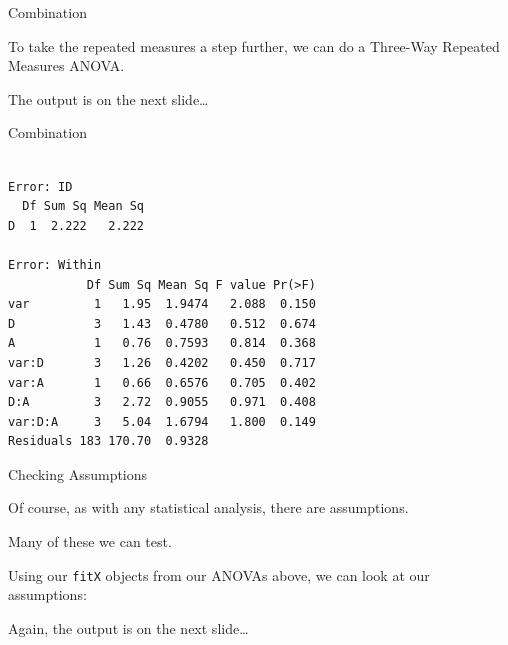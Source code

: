 \begin{frame}[fragile]{Combination}

To take the repeated measures a step further, we can do a Three-Way
Repeated Measures ANOVA.

\begin{Shaded}
\begin{Highlighting}[]
\StringTok{ }\OperatorTok{~}\StringTok{ }\OperatorTok{*}\StringTok{ }\OperatorTok{*}\StringTok{ }\OperatorTok{+}\StringTok{ }
\end{Highlighting}
\end{Shaded}

\center
\small
The output is on the next slide\ldots{}

\end{frame}

\begin{frame}[fragile]{Combination}

\small

\begin{verbatim}

Error: ID
  Df Sum Sq Mean Sq
D  1  2.222   2.222

Error: Within
           Df Sum Sq Mean Sq F value Pr(>F)
var         1   1.95  1.9474   2.088  0.150
D           3   1.43  0.4780   0.512  0.674
A           1   0.76  0.7593   0.814  0.368
var:D       3   1.26  0.4202   0.450  0.717
var:A       1   0.66  0.6576   0.705  0.402
D:A         3   2.72  0.9055   0.971  0.408
var:D:A     3   5.04  1.6794   1.800  0.149
Residuals 183 170.70  0.9328               
\end{verbatim}

\end{frame}

\begin{frame}[fragile]{Checking Assumptions}

\center
Of course, as with any statistical analysis, there are assumptions.

Many of these we can test.

Using our \texttt{fitX} objects from our ANOVAs above, we can look at
our assumptions:

\begin{Shaded}
\begin{Highlighting}[]
\NormalTok{(} \NormalTok{(}\NormalTok{,}\NormalTok{))}
\end{Highlighting}
\end{Shaded}

\center
\small
Again, the output is on the next slide\ldots{}

\end{frame}

